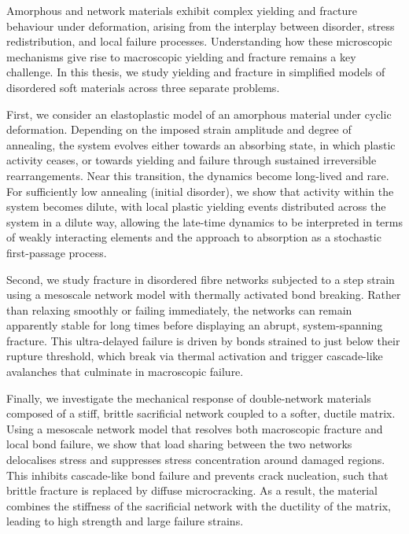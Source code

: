 Amorphous and network materials exhibit complex yielding and fracture behaviour under deformation, arising from the interplay between disorder, stress redistribution, and local failure processes. Understanding how these microscopic mechanisms give rise to macroscopic yielding and fracture remains a key challenge. In this thesis, we study yielding and fracture in simplified models of disordered soft materials across three separate problems.

First, we consider an elastoplastic model of an amorphous material under cyclic deformation. Depending on the imposed strain amplitude and degree of annealing, the system evolves either towards an absorbing state, in which plastic activity ceases, or towards yielding and failure through sustained irreversible rearrangements. Near this transition, the dynamics become long-lived and rare. For sufficiently low annealing (initial disorder), we show that activity within the system becomes dilute, with local plastic yielding events distributed across the system in a dilute way, allowing the late-time dynamics to be interpreted in terms of weakly interacting elements and the approach to absorption as a stochastic first-passage process.

Second, we study fracture in disordered fibre networks subjected to a step strain using a mesoscale network model with thermally activated bond breaking. Rather than relaxing smoothly or failing immediately, the networks can remain apparently stable for long times before displaying an abrupt, system-spanning fracture. This ultra-delayed failure is driven by bonds strained to just below their rupture threshold, which break via thermal activation and trigger cascade-like avalanches that culminate in macroscopic failure.

Finally, we investigate the mechanical response of double-network materials composed of a stiff, brittle sacrificial network coupled to a softer, ductile matrix. Using a mesoscale network model that resolves both macroscopic fracture and local bond failure, we show that load sharing between the two networks delocalises stress and suppresses stress concentration around damaged regions. This inhibits cascade-like bond failure and prevents crack nucleation, such that brittle fracture is replaced by diffuse microcracking. As a result, the material combines the stiffness of the sacrificial network with the ductility of the matrix, leading to high strength and large failure strains.